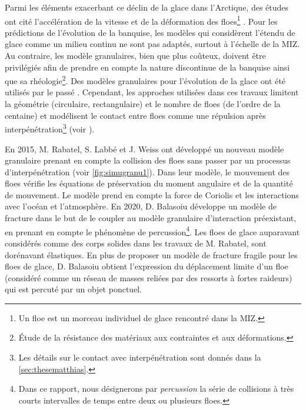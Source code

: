 Parmi les éléments exacerbant ce déclin de la glace dans l'Arctique, des études ont cité l'accélération de la vitesse et de la déformation des floes\footnote{Un floe est un morceau individuel de glace rencontré dans la MIZ.} \parencite{rampal2011ipcc,spreen2011trends}. Pour les prédictions de l'évolution de la banquise, les modèles qui considèrent l'étendu de glace comme un milieu continu ne sont pas adaptés, surtout à l'échelle de la MIZ. Au contraire, les modèle granulaires, bien que plus coûteux, doivent être privilégiés afin de prendre en compte la nature discontinue de la banquise ainsi que sa rhéologie\footnote{Étude de la résistance des matériaux aux contraintes et aux déformations.}. Des modèles granulaires pour l'évolution de la glace ont été utilisés par le passé \parencite{hopkins1996mesoscale,kjerstad2014modeling}. Cependant, les approches utilisées dans ces travaux limitent la géométrie (circulaire, rectangulaire) et le nombre de floes (de l'ordre de la centaine) et modélisent le contact entre floes comme une répulsion après interpénétration\footnote{Les détails sur le contact avec interpénétration sont donnés dans la \cref{sec:thesematthias}.} (voir \parencite[p.16]{balasoiu2020halthesis}). 

En 2015, M. Rabatel, S. Labbé et J. Weiss \parencite{rabatel2015dynamics,rabatel2015thesis} ont développé un nouveau modèle granulaire prenant en compte la collision des floes sans passer par un processus d’interpénétration (voir \cref{fig:simugranu1}). Dans leur modèle, le mouvement des floes vérifie les équations de préservation du moment angulaire et de la quantité de mouvement. Le modèle prend en compte la force de Coriolis et les interactions avec l’océan et l’atmosphère. En 2020, D. Balasoiu \parencite{balasoiu2020halthesis} développe un modèle de fracture dans le but de le coupler au modèle granulaire d'interaction préexistant, en prenant en compte le phénomène de percussion\footnote{Dans ce rapport, nous désignerons par \emph{percussion} la série de collisions à très courts intervalles de temps entre deux ou plusieurs floes.}. Les floes de glace auparavant considérés comme des corps solides dans les travaux de M. Rabatel, sont dorénavant élastiques. En plus de proposer un modèle de fracture fragile pour les floes de glace, D. Balasoiu obtient l’expression du déplacement limite d'un floe (considéré comme un réseau de masses reliées par des ressorts à fortes raideurs) qui est percuté par un objet ponctuel.

